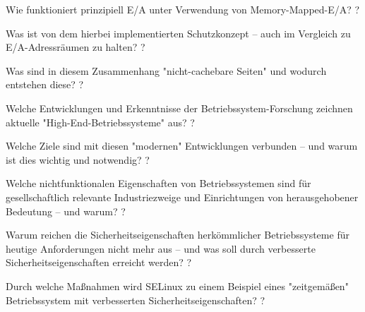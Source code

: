 \documentclass[avery5371]{flashcards}
\begin{document}
\begin{flashcard}{Wie funktioniert prinzipiell E/A unter Verwendung von Memory-Mapped-E/A?}
    ?
\end{flashcard}

\begin{flashcard}{Was ist von dem hierbei implementierten Schutzkonzept – auch im Vergleich zu E/A-Adressräumen zu halten?}
    ?
\end{flashcard}

\begin{flashcard}{Was sind in diesem Zusammenhang "nicht-cachebare Seiten" und wodurch entstehen diese?}
    ?
\end{flashcard}

\begin{flashcard}{Welche Entwicklungen und Erkenntnisse der Betriebssystem-Forschung zeichnen aktuelle "High-End-Betriebssysteme" aus?}
    ?
\end{flashcard}

\begin{flashcard}{Welche Ziele sind mit diesen "modernen" Entwicklungen verbunden – und warum ist dies wichtig und notwendig?}
    ?
\end{flashcard}

\begin{flashcard}{Welche nichtfunktionalen Eigenschaften von Betriebssystemen sind für gesellschaftlich relevante Industriezweige und Einrichtungen von herausgehobener Bedeutung – und warum?}
    ?
\end{flashcard}

\begin{flashcard}{Warum reichen die Sicherheitseigenschaften herkömmlicher Betriebssysteme für heutige Anforderungen nicht mehr aus – und was soll durch verbesserte Sicherheitseigenschaften erreicht werden?}
    ?
\end{flashcard}

\begin{flashcard}{Durch welche Maßnahmen wird SELinux zu einem Beispiel eines "zeitgemäßen" Betriebssystem mit verbesserten Sicherheitseigenschaften?}
    ?
\end{flashcard}
\end{document}
